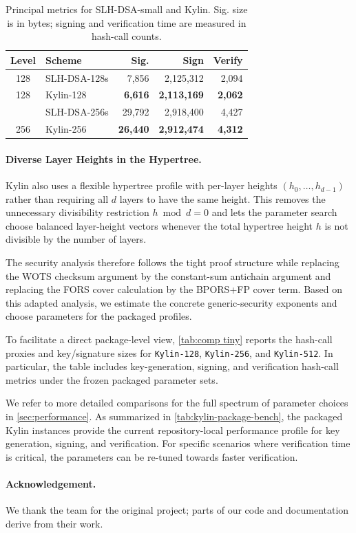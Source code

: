 \begin{table}[t]
    \centering
    \caption{Principal metrics for SLH-DSA-small and Kylin.  Sig. size is in
    bytes; signing and verification time are measured in hash-call counts.}
    \label{tab:slh-kylin-small-comp}
    \small
    \setlength{\tabcolsep}{5pt}
    \begin{tabular}{@{}c l r r r@{}}
    \toprule
      Level & Scheme & Sig. & Sign & Verify \\
      \midrule
      128 & SLH-DSA-128s & 7,856 & 2,125,312 & 2,094 \\
      128 & Kylin-128 & \textbf{6,616} & \textbf{2,113,169} & \textbf{2,062} \\
      \addlinespace[1pt]
      256 & SLH-DSA-256s & 29,792 & 2,918,400 & 4,427 \\
      256 & Kylin-256 & \textbf{26,440} & \textbf{2,912,474} & \textbf{4,312} \\
     \bottomrule
    \end{tabular}
\end{table}

\paragraph{Diverse Layer Heights in the Hypertree.}
Kylin also uses a flexible hypertree profile with per-layer heights $(h_0,\ldots,h_{d-1})$ rather than requiring all $d$ layers to have the same height. This removes the unnecessary divisibility restriction $h \bmod d = 0$ and lets the parameter search choose balanced layer-height vectors whenever the total hypertree height $h$ is not divisible by the number of layers.

The security analysis therefore follows the tight \SPHINCSP proof structure
while replacing the WOTS checksum argument by the constant-sum antichain
argument and replacing the FORS cover calculation by the BPORS+FP cover term.
Based on this adapted analysis, we estimate the concrete generic-security
exponents and choose parameters for the packaged profiles.

To facilitate a direct package-level view, \cref{tab:comp tiny} reports the hash-call proxies and key/signature sizes for \texttt{Kylin-128}, \texttt{Kylin-256}, and \texttt{Kylin-512}. In particular, the table includes key-generation, signing, and verification hash-call metrics under the frozen packaged parameter sets.

We refer to more detailed comparisons for the full spectrum of parameter choices in \cref{sec:performance}.
As summarized in \cref{tab:kylin-package-bench}, the packaged Kylin instances provide the current repository-local performance profile for key generation, signing, and verification. For specific scenarios where verification time is critical, the parameters can be re-tuned towards faster verification.

\paragraph{Acknowledgement.}

We thank the \SPHINCSP team for the original project; parts of our code and
documentation derive from their work.
